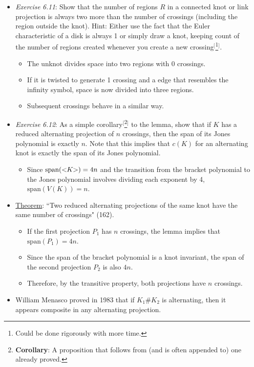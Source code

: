\documentclass[titlepage]{article}
\numberwithin{figure}{section}
\numberwithin{table}{section}
\numberwithin{equation}{section}
\newcommand{\dq}[2]{``#1" (#2).}
\newcommand{\lbq}{<\hspace{-3pt}}
\newcommand{\rbq}{\hspace{-3pt}>}
\begin{document}
\begin{itemize}
    \item \emph{Exercise 6.11}: Show that the number of regions $R$ in a connected knot or link projection is always two more than the number of crossings (including the region outside the knot). Hint: Either use the fact that the Euler characteristic of a disk is always 1 or simply draw a knot, keeping count of the number of regions created whenever you create a new crossing$^[$\footnote{Could be done rigorously with more time.}$^]$.
    \begin{itemize}
        \item The unknot divides space into two regions with 0 crossings.
        \item If it is twisted to generate 1 crossing and a edge that resembles the infinity symbol, space is now divided into three regions.
        \item Subsequent crossings behave in a similar way.
    \end{itemize}
    \item \emph{Exercise 6.12}: As a simple corollary$^[$\footnote{\textbf{Corollary}: A proposition that follows from (and is often appended to) one already proved.}$^]$ to the lemma, show that if $K$ has a reduced alternating projection of $n$ crossings, then the span of its Jones polynomial is exactly $n$. Note that this implies that $c(K)$ for an alternating knot is exactly the span of its Jones polynomial.
    \begin{itemize}
        \item Since $\text{span}(\lbq K\rbq)=4n$ and the transition from the bracket polynomial to the Jones polynomial involves dividing each exponent by 4, $\text{span}(V(K))=n$.
    \end{itemize}
    \item \underline{Theorem}: \dq{Two reduced alternating projections of the same knot have the same number of crossings}{162}
    \begin{itemize}
        \item If the first projection $P_1$ has $n$ crossings, the lemma implies that $\text{span}(P_1)=4n$.
        \item Since the span of the bracket polynomial is a knot invariant, the span of the second projection $P_2$ is also $4n$.
        \item Therefore, by the transitive property, both projections have $n$ crossings.
    \end{itemize}
    \item William Menasco proved in 1983 that if $K_1\#K_2$ is alternating, then it appears composite in any alternating projection.

\end{itemize}
\end{document}
